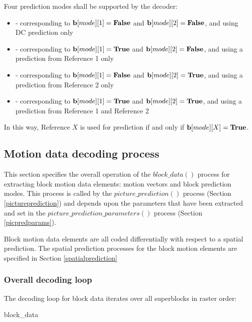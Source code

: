 Four prediction modes shall be supported by the decoder: 

\begin{itemize}
\item \Intra - corresponding to ${\bf b}[mode][1]=\text{\bf{False}}$ and ${\bf b}[mode][2]=\text{\bf{False}}$, and using DC prediction only
\item \RefOneOnly - corresponding to ${\bf b}[mode][1]=\text{\bf{True}}$ and ${\bf b}[mode][2]=\text{\bf{False}}$, and using a prediction from Reference 1 only
\item \RefTwoOnly - corresponding to ${\bf b}[mode][1]=\text{\bf{False}}$ and ${\bf b}[mode][2]=\text{\bf{True}}$, and using a prediction from Reference 2 only
\item \RefOneAndTwo - corresponding to ${\bf b}[mode][1]=\text{\bf{True}}$ and ${\bf b}[mode][2]=\text{\bf{True}}$, and using a prediction from Reference 1 and Reference 2
\end{itemize}

In this way, Reference $X$ is used for prediction if and only if ${\bf b}[mode][X]=\text{\bf{True}}$. 

\subsection{Motion data decoding process}

This section specifies the overall operation of the $block\_data()$ process for extracting
block motion data elements: motion vectors and block prediction modes. This 
process is called by the $picture\_prediction()$ process (Section \ref{pictureprediction}) and
depends upon the parameters that have been extracted and set in the
$picture\_prediction\_parameters()$ process (Section \ref{picpredparams}).

Block motion data elements are all coded differentially with respect to a spatial prediction. The
spatial prediction processes for the block motion elements are specified in Section \ref{spatialprediction}

\subsubsection{Overall decoding loop}

\label{decodingloop}

The decoding loop for block data iterates over all superblocks in raster order:

\begin{pseudo}{block\_data}{}
            \bsEND
        \bsEND
    \bsEND
\bsEND
{}
\end{pseudo}

